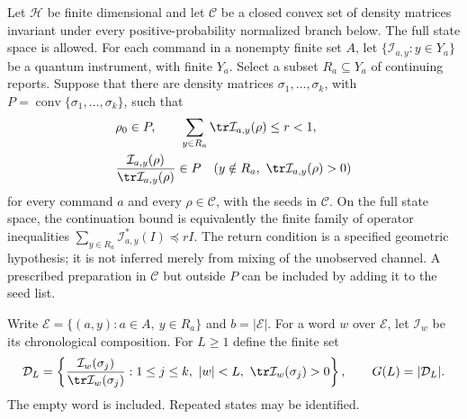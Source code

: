 Let $\mathcal H$ be finite dimensional and let $\mathcal C$ be a closed convex set
of density matrices invariant under every positive-probability normalized
branch below.  The full state space is allowed.  For each command in a nonempty
finite set $A$, let $\{\mathcal I_{a,y}:y\in Y_a\}$ be a quantum
instrument, with finite $Y_a$.  Select a subset $R_a\subseteq Y_a$ of
continuing reports.  Suppose that there are density matrices
$\sigma_1,\ldots,\sigma_k$, with
$P=\operatorname{conv}\{\sigma_1,\ldots,\sigma_k\}$, such that
\begin{equation}\label{eq:r76-return-hypotheses}
 \begin{split}
 &\rho_0\in P,\qquad
   \sum_{y\in R_a}\tr\mathcal I_{a,y}(\rho)\le r<1,\\
 &\frac{\mathcal I_{a,y}(\rho)}{\tr\mathcal I_{a,y}(\rho)}\in P
 \quad(y\notin R_a,\ \tr\mathcal I_{a,y}(\rho)>0)
 \end{split}
\end{equation}
for every command $a$ and every $\rho\in\mathcal C$, with the seeds in $\mathcal C$.
On the full state space, the continuation bound is equivalently the finite
family of operator inequalities
$\sum_{y\in R_a}\mathcal I_{a,y}^*(I)\preceq rI$.
The return condition is a specified geometric hypothesis; it is not
inferred merely from mixing of the unobserved channel.  A prescribed
preparation in $\mathcal C$ but outside $P$ can be included by adding it to the seed list.

Write $\mathcal E=\{(a,y):a\in A,\ y\in R_a\}$ and $b=|\mathcal E|$.
For a word $w$ over $\mathcal E$, let $\mathcal I_w$ be its chronological
composition.  For $L\ge1$ define the finite set
\begin{equation}\label{eq:r76-orbit-dictionary}
 \mathcal D_L=
 \left\{\frac{\mathcal I_w(\sigma_j)}{\tr\mathcal I_w(\sigma_j)}:
  1\le j\le k,\ |w|<L,\ \tr\mathcal I_w(\sigma_j)>0\right\},
 \qquad G(L)=|\mathcal D_L|.
\end{equation}
The empty word is included.  Repeated states may be identified.

